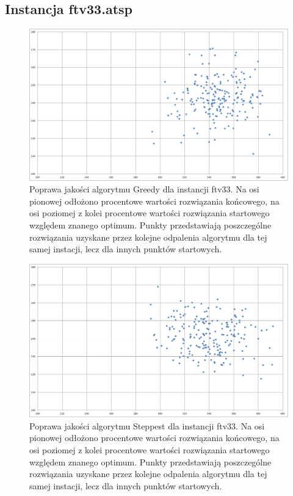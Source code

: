 \subsection{Instancja ftv33.atsp}
\begin{figure}[!h]
\centering\includegraphics[width=12cm]{img/ftv33_b2e_g.png}
\caption{Poprawa jakości algorytmu Greedy dla instancji ftv33. Na osi pionowej odłożono procentowe wartości rozwiązania końcowego, na osi poziomej z kolei procentowe wartości rozwiązania startowego względem znanego optimum. Punkty przedstawiają poszczególne rozwiązania uzyskane przez kolejne odpalenia algorytmu dla tej samej instacji, lecz dla innych punktów startowych.}\label{rys:ftv33g}
\end{figure}
\begin{figure}[!h]
\centering\includegraphics[width=12cm]{img/ftv33_b2e_s.png}
\caption{Poprawa jakości algorytmu Steppest dla instancji ftv33. Na osi pionowej odłożono procentowe wartości rozwiązania końcowego, na osi poziomej z kolei procentowe wartości rozwiązania startowego względem znanego optimum. Punkty przedstawiają poszczególne rozwiązania uzyskane przez kolejne odpalenia algorytmu dla tej samej instacji, lecz dla innych punktów startowych.}\label{rys:ftv33s}
\end{figure}

